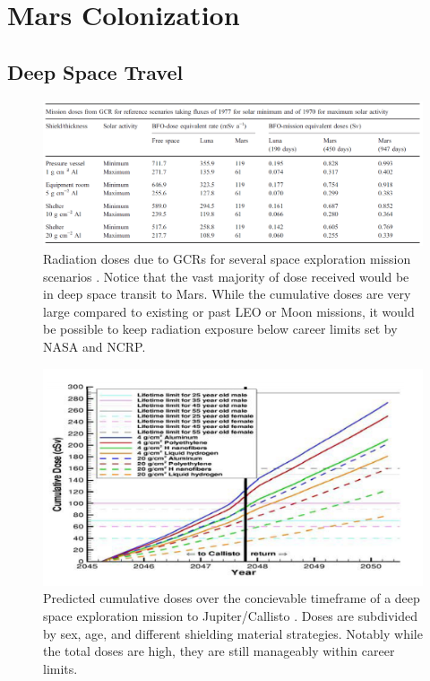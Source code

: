 \section{Mars Colonization}

\subsection{Deep Space Travel}

\begin{figure}
\centering
\includegraphics[width=\linewidth]{hellwig-doses.png}
\caption{Radiation doses due to GCRs for several space exploration mission scenarios \cite{hellwig-estimates}. Notice that the vast majority of dose received would be in deep space transit to Mars. While the cumulative doses are very large compared to existing or past LEO or Moon missions, it would be possible to keep radiation exposure below career limits set by NASA and NCRP.}
\label{fig:hellwig}
\end{figure}

\begin{figure}
\centering
\includegraphics[width=\linewidth]{deangelis-doses.png}
\caption{Predicted cumulative doses over the concievable timeframe of a deep space exploration mission to Jupiter/Callisto \cite{deangelis-scenarios}. Doses are subdivided by sex, age, and different shielding material strategies. Notably while the total doses are high, they are still manageably within career limits.}
\label{fig:deangelis}
\end{figure}

